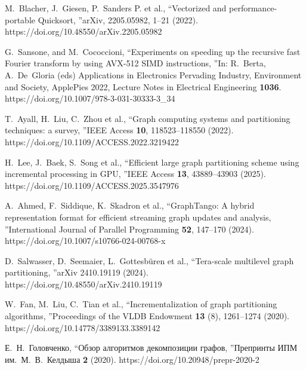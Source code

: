 \documentclass[
11pt,%
tightenlines,%
twoside,%
onecolumn,%
nofloats,%
nobibnotes,%
nofootinbib,%
superscriptaddress,%
noshowpacs,%
centertags]%
{revtex4}
\begin{document}
\begin{thebibliography}{99}
M.~Blacher, J.~Giesen, P.~Sanders P. et al., \textquotedblleft Vectorized and performance-portable Quicksort, \textquotedblright arXiv, 2205.05982, 1--21 (2022). https://doi.org/10.48550/arXiv.2205.05982

G.~Sansone, and M.~Cococcioni, \textquotedblleft Experiments on speeding up the recursive fast Fourier transform by using AVX-512 SIMD instructions, \textquotedblright In: R.~Berta, A.~De~Gloria (eds) Applications in Electronics Pervading Industry, Environment and Society, ApplePies 2022, Lecture Notes in Electrical Engineering \textbf{1036}. https://doi.org/10.1007/978-3-031-30333-3\_34


T.~Ayall, H.~Liu, C.~Zhou et al., \textquotedblleft Graph computing systems and partitioning techniques: a survey, \textquotedblright IEEE Access \textbf{10}, 118523--118550 (2022). https://doi.org/10.1109/ACCESS.2022.3219422

H.~Lee, J.~Baek, S.~Song et al., \textquotedblleft Efficient large graph partitioning scheme using incremental processing in GPU, \textquotedblright IEEE Access \textbf{13}, 43889--43903 (2025). https://doi.org/10.1109/ACCESS.2025.3547976

A.~Ahmed, F.~Siddique, K.~Skadron et al., \textquotedblleft GraphTango: A hybrid representation format for efficient streaming graph updates and analysis, \textquotedblright International Journal of Parallel Programming \textbf{52}, 147--170 (2024). https://doi.org/10.1007/s10766-024-00768-x

D.~Salwasser, D.~Seemaier, L.~Gottesb\"uren et al., \textquotedblleft Tera-scale multilevel graph partitioning, \textquotedblright arXiv 2410.19119 (2024). https://doi.org/10.48550/arXiv.2410.19119

W.~Fan, M.~Liu, C.~Tian et al., \textquotedblleft Incrementalization of graph partitioning algorithms, \textquotedblright Proceedings of the VLDB Endowment \textbf{13} (8), 1261--1274 (2020). https://doi.org/10.14778/3389133.3389142

Е.~Н.~Головченко, \textquotedblleft Обзор алгоритмов декомпозиции графов, \textquotedblright Препринты ИПМ им.~М.~В.~Келдыша \textbf{2} (2020). https://doi.org/10.20948/prepr-2020-2


\end{thebibliography}
\end{document}
